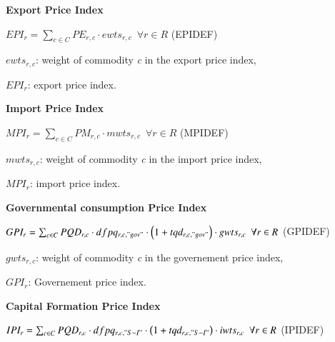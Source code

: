 \documentclass[10pt,a4paper,titlepage,dvipdfmx]{book}
\begin{document}
\begin{flushleft}\textbf{Export Price Index}\end{flushleft}


\begin{center}$EPI_{r}=\sum _{c\in C}PE_{r,c}\cdot ewts_{r,c}\,\,\,\forall r\in R$ (EPIDEF)
\end{center}

\begin{flushleft}
$ewts_{r,c}$: weight of commodity \textit{c} in the export price index,

$EPI_{r}$: export price index.
\end{flushleft}

\begin{flushleft}\textbf{Import Price Index}\end{flushleft}


\begin{center}$MPI_{r}=\sum _{c\in C}PM_{r,c}\cdot mwts_{r,c}\,\,\,\forall r\in R$ (MPIDEF)
\end{center}

\begin{flushleft}

$mwts_{r,c}$: weight of commodity \textit{c} in the import price index,

$MPI_{r}$: import price index.
\end{flushleft}

\begin{flushleft}\textbf{Governmental consumption Price Index}\end{flushleft}


\begin{center}$GPI_{r}=\sum _{c\in C}PQD_{r,c}\cdot dfpq_{r,c,"gov"}\cdot \left(1+tqd_{r,c,"gov"}\right)\cdot gwts_{r,c}\,\,\,\forall r\in R$ (GPIDEF)
\end{center}

\begin{flushleft}

$gwts_{r,c}$: weight of commodity \textit{c} in the governement price index,

$GPI_{r}$: Governement price index.
\end{flushleft}

\begin{flushleft}\textbf{Capital Formation Price Index}\end{flushleft}


\begin{center}$IPI_{r}=\sum _{c\in C}PQD_{r,c}\cdot dfpq_{r,c,"S-I"}\cdot \left(1+tqd_{r,c,"S-I"}\right)\cdot iwts_{r,c}\,\,\,\forall r\in R$ (IPIDEF)
\end{center}
\end{document}
